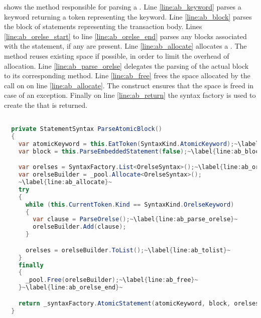  shows the  method responsible for parsing a . Line \ref{line:ab_keyword} parses a  keyword returning a token representing the keyword. Line \ref{line:ab_block} parses the block of statements representing the transaction body. Lines \ref{line:ab_orelse_start} to line \ref{line:ab_orelse_end} parses any  blocks associated with the  statement, if any are present. Line \ref{line:ab_allocate} allocates a . The  method reuses existing space if possible, in order to limit the overhead of allocation. Line \ref{line:ab_parse_orelse} delegates the parsing of the actual  block to its corresponding method. Line \ref{line:ab_free} frees the space allocated by the call on on line \ref{line:ab_allocate}. The  construct ensures that the space is freed in case of an exception. Finally on line \ref{line:ab_return} the syntax factory is used to create the  that is returned.

\begin{lstlisting}[label=lst:parse_atomic_block,
  caption={Method for parsing \bscode{atomic} block},
  language=Java,  
  showspaces=false,
  showtabs=false,
  breaklines=true,
  showstringspaces=false,
  breakatwhitespace=true,
  commentstyle=\color{greencomments},
  keywordstyle=\color{bluekeywords},
  stringstyle=\color{redstrings},
  escapechar=~,
  morekeywords={atomic, retry, orElse, var, get, set}]  % Start your code-block

  private StatementSyntax ParseAtomicBlock()
  { 
    var atomicKeyword = this.EatToken(SyntaxKind.AtomicKeyword);~\label{line:ab_keyword}~
    var block = this.ParseEmbeddedStatement(false);~\label{line:ab_block}~

    var orelses = SyntaxFactory.List<OrelseSyntax>();~\label{line:ab_orelse_start}~
    var orelseBuilder = _pool.Allocate<OrelseSyntax>();
    ~\label{line:ab_allocate}~
    try
    {
      while (this.CurrentToken.Kind == SyntaxKind.OrelseKeyword)
      {
        var clause = ParseOrelse();~\label{line:ab_parse_orelse}~
        orelseBuilder.Add(clause);
      }

      orelses = orelseBuilder.ToList();~\label{line:ab_tolist}~
    }
    finally
    {
      _pool.Free(orelseBuilder);~\label{line:ab_free}~
    }~\label{line:ab_orelse_end}~

    return _syntaxFactory.AtomicStatement(atomicKeyword, block, orelses);~\label{line:ab_return}~
  }
\end{lstlisting}

